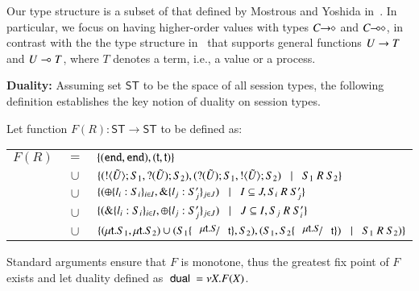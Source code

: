 Our type structure is a subset of that defined by Mostrous and Yoshida in~\cite{tlca07}.
In particular, we focus on having higher-order values with types
$C\!\! \rightarrow\!\! \diamond$ and $C\!\! \multimap\!\! \diamond$, in contrast with the the type structure
in~\cite{tlca07} that supports general functions
$U \rightarrow T$ and 
$U \multimap T$, where $T$ denotes a term, i.e., a value or a process.


{\bf Duality: }
Assuming set $\mathsf{ST}$ to be the space of all session types,
the following definition establishes the key notion of duality on session types.
%
\begin{definition}[Duality]\rm
	Let function $F(R): \mathsf{ST} \longrightarrow \mathsf{ST}$ to be defined as:

	\begin{tabular}{rcl}
		$F(R)$ &$=$&		$\{(\mathtt{end}, \mathtt{end}), (\mathsf{t}, \mathsf{t})\}$\\
			&$\cup$&	$\set{(\btout{\tilde{U}} S_1, \btinp{\tilde{U}} S_2), (\btinp{\tilde{U}} S_1, \btout{\tilde{U}} S_2) \bnfbar S_1\ R\ S_2}$\\
			&$\cup$&	$\{(\oplus \{l_i: S_i\}_{i \in I}, \& \{l_j: S_j'\}_{j \in J}) \;\;\;|\;\;\; I \subseteq J, S_i\ R\ S_j'\}$\\
			&$\cup$&	$\{(\& \{l_i: S_i\}_{i \in I}, \oplus \{l_j: S_j'\}_{j \in J}) \;\;\;|\;\;\; J \subseteq I, S_j\ R\ S_i'\}$\\
			&$\cup$&	$\set{(\trec{t}{S_1}, \trec{t}{S_2}) \cup (S_1 \subst{\trec{t}{S}}{\vart{t}}, S_2), (S_1, S_2\subst{\trec{t}{S}}{\vart{t}}) \bnfbar S_1\ R\ S_2)}$
	\end{tabular}
	
\noindent
	Standard arguments ensure that $F$ is monotone, thus the greatest fix point
	of $F$ exists and let duality defined as $\ \mathsf{dual}\  = \nu X. F(X)$.
\end{definition}
%

